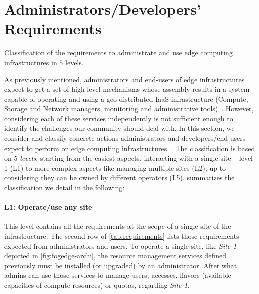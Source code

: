 
\section{Administrators/Developers' Requirements}
\label{sec:requirements}

%   

\begin{table*}
    \centering
        
    \caption{Classification of the requirements to administrate and use edge
    computing infrastructures in $5$ levels.}
    \label{tab:requirements}
\end{table*}

As previously mentioned, administrators and end-users of edge
infrastructures expect to get a set of high level mechanisms whose
assembly results in a system capable of operating and using a
geo-distributed IaaS infrastructure (Compute, Storage and Network
managers, monitoring and administrative tools)~\cite{moreno2012csp}.
However, considering each of these services independently is not
sufficient enough to identify the challenges our community should deal with.
%
In this section, we consider and classify concrete actions administrators and
developers/end-users expect to perform on edge computing infrastructures.
.
The classification is based on $5$ \emph{levels},
starting from the easiest aspects, \ie interacting with a single site
-- level 1 (L1) to more complex aspects like managing multiple
sites (L2), up to considering they can be owned by different operators
(L5).   summarizes the classification we detail
in the following:

\paragraph{L1: Operate/use any site}
This level contains all the requirements at the scope of a single site of the
infrastructure. The second row of \cref{tab:requirements} lists those
requirements expected from administrators and users. To operate a single site,
like \emph{Site 1} depicted in \cref{fig:fogedge-archi}, the resource management
services defined previously must be installed (or upgraded) by an
administrator. After what, admins can use those services to manage users,
accesses, flavors (\ie available capacities of compute resources) or quotas,
regarding \emph{Site 1}.

